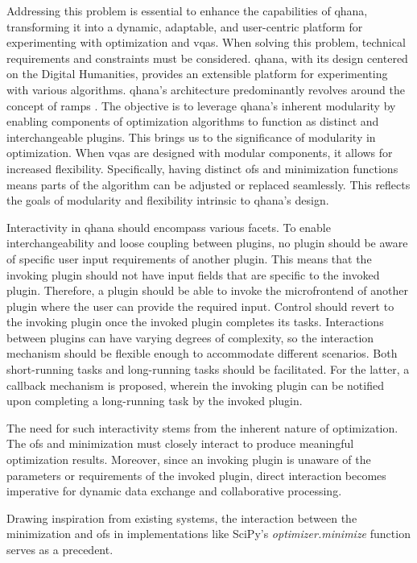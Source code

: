 \documentclass[
  a4paper,  %
  twoside,  %
  bibliography=totoc,
  headsepline,
  cleardoublepage=empty,
  parskip=half,
  draft=false
]{scrbook}
\begin{document}
Addressing this problem is essential to enhance the capabilities of \gls{qhana}, transforming it into a dynamic, adaptable, and user-centric platform for experimenting with optimization and \glspl{vqa}.
When solving this problem, technical requirements and constraints must be considered.
\gls{qhana}, with its design centered on the Digital Humanities, provides an extensible platform for experimenting with various algorithms.
\gls{qhana}'s architecture predominantly revolves around the concept of \glspl{ramp} \cite{Buehler2022}.
The objective is to leverage \gls{qhana}'s inherent modularity by enabling components of optimization algorithms to function as distinct and interchangeable plugins.
This brings us to the significance of modularity in optimization.
When \glspl{vqa} are designed with modular components, it allows for increased flexibility.
Specifically, having distinct \glspl{of} and minimization functions means parts of the algorithm can be adjusted or replaced seamlessly.
This reflects the goals of modularity and flexibility intrinsic to \gls{qhana}'s design.

Interactivity in \gls{qhana} should encompass various facets.
To enable interchangeability and loose coupling between plugins, no plugin should be aware of specific user input requirements of another plugin.
This means that the invoking plugin should not have input fields that are specific to the invoked plugin.
Therefore, a plugin should be able to invoke the microfrontend of another plugin where the user can provide the required input.
Control should revert to the invoking plugin once the invoked plugin completes its tasks.
Interactions between plugins can have varying degrees of complexity, so the interaction mechanism should be flexible enough to accommodate different scenarios.
Both short-running tasks and long-running tasks should be facilitated.
For the latter, a callback mechanism is proposed, wherein the invoking plugin can be notified upon completing a long-running task by the invoked plugin.

The need for such interactivity stems from the inherent nature of optimization.
The \glspl{of} and minimization must closely interact to produce meaningful optimization results.
Moreover, since an invoking plugin is unaware of the parameters or requirements of the invoked plugin, direct interaction becomes imperative for dynamic data exchange and collaborative processing.

Drawing inspiration from existing systems, the interaction between the minimization and \glspl{of} in implementations like SciPy's \emph{optimizer.minimize} \cite{Virtanen2020} function serves as a precedent.
\end{document}
